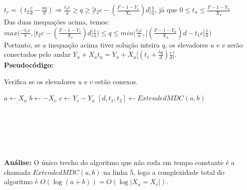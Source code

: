 $t_v = (t_2\frac{c}{d} - \frac{aq}{d}) \Rightarrow \frac{t_2c}{a} \geq q \geq \big[t_2c - (\frac{F-1-Y_v}{X_v})d\big]\frac{1}{a}$, já que $0\leq t_u\leq \frac{F-1-Y_u}{X_u}$
\\

Das duas inequações acima, temos:
\\

$max\Big(\frac{-t_1c}{b}, \big[t_2c - (\frac{F-1-Y_v}{X_v})d\big]\frac{1}{a} \Big) \leq q \leq min\Big(\frac{t_2c}{a}, \big[(\frac{F-1-Y_u}{X_u})d - t_1c\big]\frac{1}{b}  \Big)$
\\

Portanto, se a inequação acima tiver solução inteira $q$, os elevadores $u$ e $v$ serão conectados pelo andar $Y_u+X_ut_u = Y_u+X_u\big[(t_1 + \frac{bq}{d})\frac{c}{d}\big]$.
\\

\textbf{Pseudocódigo:}
\begin{algorithm}
\caption{Verifica se os elevadores $u$ e $v$ estão conexos.}\label{euclid}
\begin{algorithmic}[1]
\State $a \gets X_u$
\State $b \gets -X_v$
\State $c \gets Y_v-Y_u$
\State $[d,t_1,t_2] \gets ExtendedMDC(a,b)$
\\
\State {}
\EndIf
\\
\State {}
\EndIf
\\
\\
\\
\State {}
\EndIf
\\
\State {}

\EndProcedure
\end{algorithmic}
\end{algorithm}

\textbf{Análise:}
O único trecho do algoritmo que não roda em tempo constante é a chamada $ExtendedMDC(a,b)$ na linha $5$, logo a complexidade total do algoritmo é $O(\log(a+b)) = O(\log|X_u=X_v|)$.

